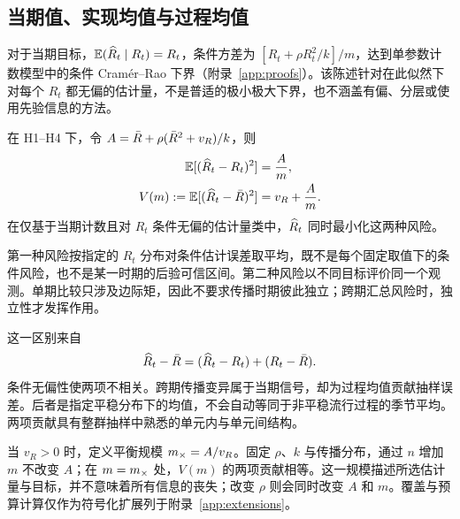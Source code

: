 \subsection{当期值、实现均值与过程均值}
\label{sec:bg-variance}

对于当期目标，$\mathbb{E}(\widehat R_t\mid R_t)=R_t$，条件方差为 $[R_t+\rho R_t^2/k]/m$，达到单参数计数模型中的条件 Cram\'er--Rao 下界（附录~\ref{app:proofs}）。该陈述针对在此似然下对每个 $R_t$ 都无偏的估计量，不是普适的极小极大下界，也不涵盖有偏、分层或使用先验信息的方法。

\begin{proposition}[单个时期的两个目标]
\label{prop:average}
在 H1--H4 下，令 $A=\bar R+\rho(\bar R^2+v_R)/k$，则
\begin{equation}
\begin{aligned}
  \mathbb{E}[(\widehat R_t-R_t)^2]&=\frac{A}{m},\\
  V(m):=\mathbb{E}[(\widehat R_t-\bar R)^2]&=v_R+\frac{A}{m}.
\end{aligned}
  \label{eq:var-average}
\end{equation}
在仅基于当期计数且对 $R_t$ 条件无偏的估计量类中，$\widehat R_t$ 同时最小化这两种风险。
\end{proposition}

第一种风险按指定的 $R_t$ 分布对条件估计误差取平均，既不是每个固定取值下的条件风险，也不是某一时期的后验可信区间。第二种风险以不同目标评价同一个观测。单期比较只涉及边际矩，因此不要求传播时期彼此独立；跨期汇总风险时，独立性才发挥作用。

这一区别来自
\begin{equation}
  \widehat R_t-\bar R=(\widehat R_t-R_t)+(R_t-\bar R).
  \label{eq:error-split}
\end{equation}
条件无偏性使两项不相关。跨期传播变异属于当期信号，却为过程均值贡献抽样误差。后者是指定平稳分布下的均值，不会自动等同于非平稳流行过程的季节平均。两项贡献具有整群抽样中熟悉的单元内与单元间结构\citep{cochran1977sampling, engen1998demographic}。

当 $v_R>0$ 时，定义平衡规模 $m_{\times}=A/v_R$。固定 $\rho$、$k$ 与传播分布，通过 $n$ 增加 $m$ 不改变 $A$；在 $m=m_{\times}$ 处，$V(m)$ 的两项贡献相等。这一规模描述所选估计量与目标，并不意味着所有信息的丧失；改变 $\rho$ 则会同时改变 $A$ 和 $m$。覆盖与预算计算仅作为符号化扩展列于附录~\ref{app:extensions}。

